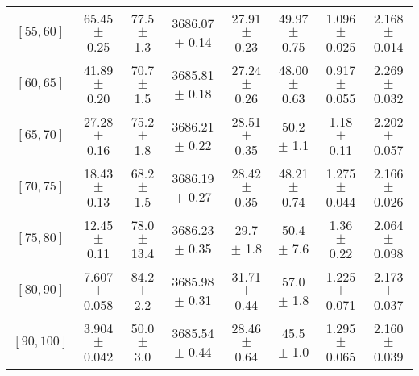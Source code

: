 \begin{tabular}{c||c|c|c|c|c|c|c}
$[55, 60]$ & 65.45 $\pm$ 0.25 & 77.5 $\pm$ 1.3 & 3686.07 $\pm$ 0.14 & 27.91 $\pm$ 0.23 & 49.97 $\pm$ 0.75 & 1.096 $\pm$ 0.025 & 2.168 $\pm$ 0.014\\
$[60, 65]$ & 41.89 $\pm$ 0.20 & 70.7 $\pm$ 1.5 & 3685.81 $\pm$ 0.18 & 27.24 $\pm$ 0.26 & 48.00 $\pm$ 0.63 & 0.917 $\pm$ 0.055 & 2.269 $\pm$ 0.032\\
$[65, 70]$ & 27.28 $\pm$ 0.16 & 75.2 $\pm$ 1.8 & 3686.21 $\pm$ 0.22 & 28.51 $\pm$ 0.35 & 50.2 $\pm$ 1.1 & 1.18 $\pm$ 0.11 & 2.202 $\pm$ 0.057\\
$[70, 75]$ & 18.43 $\pm$ 0.13 & 68.2 $\pm$ 1.5 & 3686.19 $\pm$ 0.27 & 28.42 $\pm$ 0.35 & 48.21 $\pm$ 0.74 & 1.275 $\pm$ 0.044 & 2.166 $\pm$ 0.026\\
$[75, 80]$ & 12.45 $\pm$ 0.11 & 78.0 $\pm$ 13.4 & 3686.23 $\pm$ 0.35 & 29.7 $\pm$ 1.8 & 50.4 $\pm$ 7.6 & 1.36 $\pm$ 0.22 & 2.064 $\pm$ 0.098\\
$[80, 90]$ & 7.607 $\pm$ 0.058 & 84.2 $\pm$ 2.2 & 3685.98 $\pm$ 0.31 & 31.71 $\pm$ 0.44 & 57.0 $\pm$ 1.8 & 1.225 $\pm$ 0.071 & 2.173 $\pm$ 0.037\\
$[90, 100]$ & 3.904 $\pm$ 0.042 & 50.0 $\pm$ 3.0 & 3685.54 $\pm$ 0.44 & 28.46 $\pm$ 0.64 & 45.5 $\pm$ 1.0 & 1.295 $\pm$ 0.065 & 2.160 $\pm$ 0.039\\
\end{tabular}
